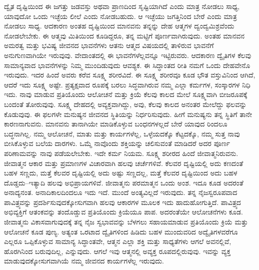 ದ್ವೈತ ದೃಷ್ಟಿಯಿಂದ ಈ ಜಗತ್ತು ಜಡವಸ್ತು ಅಥವಾ ಪ್ರಾಣದಿಂದ ಸೃಷ್ಟಿಯಾಗಿದೆ ಎಂದು ಮಾತ್ರ ನೋಡಲು ಸಾಧ್ಯ, ಯಾವುದೋ ಒಂದು ಇಚ್ಛೆಯ ಲೀಲೆ ಎಂದು ನೋಡಬಹುದು. ಆ ಇಚ್ಛೆಯು ಜಗತ್ತಿನಿಂದ ಬೇರೆ ಎಂದು ಮಾತ್ರ ನೋಡಲು ಸಾಧ್ಯ. ಆದಕಾರಣ ಅಂತಹ ದೃಷ್ಟಿಯಿಂದ ಮಾನವನು ತನ್ನನ್ನು ದೇಹ ಆತ್ಮಗಳ ದ್ವಂದ್ವಮಿಶ್ರವೆಂದು ನೋಡಲೇಬೇಕು. ಈ ಆತ್ಮವು ಮಿತಿಯಿಂದ ಕೂಡಿದ್ದರೂ, ತನ್ನ ಮಟ್ಟಿಗೆ ಪೂರ್ಣವಾಗಿರುವುದು. ಅಂತಹ ಮಾನವನ ಅಮರತ್ವ ಮತ್ತು ಭವಿಷ್ಯ ಜೀವನದ ಭಾವನೆಗಳು ಆತನು ಆತ್ಮದ ವಿಷಯದಲ್ಲಿ ತಾಳಿರುವ ಭಾವನೆಗೆ ಅನುಗುಣವಾಗಿಯೇ ಇರುವುವು. ವೇದಾಂತದಲ್ಲಿ ಈ ಭಾವನೆಗಳೆಲ್ಲವನ್ನೂ ಇಟ್ಟಿರುವರು. ಆದಕಾರಣ ದ್ವೈತಿಗಳ ಕೆಲವು ಸಾಮಾನ್ಯವಾದ ಭಾವನೆಗಳನ್ನು ನಿಮ್ಮ ಮುಂದಿಡುವುದು ಆವಶ್ಯಕ. ಈ ಸಿದ್ಧಾಂತದ ರೀತಿ ನಮಗೆ ಒಂದು ದೇಹವೇನೊ ಇರುವುದು. ಇದರ ಹಿಂದೆ ಅವರು ಕರೆವ ಸೂಕ್ಷ್ಮ ಶರೀರವಿದೆ. ಈ ಸೂಕ್ಷ್ಮ ಶರೀರವೂ ಕೂಡ ಭೌತ ವಸ್ತುವಿನಿಂದ ಆಗಿದೆ, ಆದರೆ ಇದು ಸೂಕ್ಷ್ಮ ಅಷ್ಟೇ. ಪ್ರತ್ಯಕ್ಷವಾದ ರೂಪಕ್ಕೆ ಬರಲು ಸಿದ್ಧವಾಗಿರುವ ನಮ್ಮ ಎಲ್ಲಾ ಕರ್ಮಗಳ, ಸಂಸ್ಕಾರಗಳ ನಿಧಿ ಇದು. ನಾವು ಮಾಡುವ ಪ್ರತಿಯೊಂದು ಆಲೋಚನೆ ಮತ್ತು ಕ್ರಿಯೆ ಕೆಲವು ಕಾಲದ ಮೇಲೆ ಸೂಕ್ಷ್ಮವಾಗಿ ಬೀಜರೂಪಕ್ಕೆ ಬಂದಂತೆ ತೋರುವುವು. ಸೂಕ್ಷ್ಮ ದೇಹದಲ್ಲಿ ಅವ್ಯಕ್ತವಾಗಿದ್ದು, ಅವು, ಕೆಲವು ಕಾಲದ ಅನಂತರ ಮೇಲೆದ್ದು ಫಲವನ್ನು ಕೊಡುವುವು. ಈ ಫಲಗಳೇ ಮನುಷ್ಯನ ಜೀವನದ ಸ್ಥಿತಿಯನ್ನು ನಿರ್ಧರಿಸುವುದು. ಹೀಗೆ ಮನುಷ್ಯನು ತನ್ನ ಸ್ಥಿತಿಗೆ ತಾನೇ ಕಾರಣನಾಗುವನು. ಮಾನವನು ತಾನಾಗಿಯೇ ಮಾಡಿಕೊಳ್ಳುವ ಬಂಧನಗಳಲ್ಲದೆ ಬೇರೆ ಯಾವುದ ರಿಂದಲೂ ಬದ್ಧನಾಗಿಲ್ಲ. ನಮ್ಮ ಆಲೋಚನೆ, ಮಾತು ಮತ್ತು ಕಾರ್ಯಗಳೆಲ್ಲ, ಒಳ್ಳೆಯದಕ್ಕೊ ಕೆಟ್ಟದಕ್ಕೊ, ನಮ್ಮ ಸುತ್ತ ನಾವು ಬೀಸಿಕೊಳ್ಳುವ ಬಲೆಯ ದಾರಗಳು. ಒಮ್ಮೆ ನಾವೊಂದು ಶಕ್ತಿಯನ್ನು ಚಲಿಸುವಂತೆ ಮಾಡಿದರೆ ಅದರ ಪೂರ್ಣ ಪರಿಣಾಮವನ್ನು ನಾವು ಪಡೆಯಲೇಬೇಕು. ಇದೇ ಕರ್ಮ ನಿಯಮ. ಸೂಕ್ಷ್ಮ ಶರೀರದ ಹಿಂದೆ ಜೀವಾತ್ಮನಿರುವನು. ಜೀವಾತ್ಮನ ಆಕಾರ ಮತ್ತು ಪ್ರಮಾಣಗಳ ವಿಚಾರವಾಗಿ ಹಲವು ಚರ್ಚೆಗಳಿವೆ. ಕೆಲವರ ದೃಷ್ಟಿಯಲ್ಲಿ ಅದು ಕಣದಂತೆ ಬಹಳ ಸಣ್ಣದು, ಮತ್ತೆ ಕೆಲವರ ದೃಷ್ಟಿಯಲ್ಲಿ ಅದು ಅಷ್ಟು ಸಣ್ಣದಲ್ಲ, ಮತ್ತೆ ಕೆಲವರ ದೃಷ್ಟಿಯಿಂದ ಅದು ಬಹಳ ದೊಡ್ಡದು–ಇತ್ಯಾದಿ ಹಲವು ಅಭಿಪ್ರಾಯಗಳಿವೆ. ಜೀವಾತ್ಮನು ಪರಮಾತ್ಮನ ಒಂದು ಅಂಶ. ಇದೂ ಕೂಡ ಅದರಂತೆ ಅನಾದ್ಯನಂತ. ಅನಾದಿಕಾಲದಿಂದಲೂ ಇದು ಇದೆ. ಮುಂದೆ ಅಂತ್ಯವಿಲ್ಲದೆ ಇರುವುದು. ತನ್ನ ನೈಜಸ್ವರೂಪವಾದ ಪಾವಿತ್ರ್ಯವನ್ನು ಪ್ರದರ್ಶಿಸುವುದಕ್ಕೋಸುಗವಾಗಿ ಹಲವು ಆಕಾರಗಳ ಮೂಲಕ ಇದು ಹಾದುಹೋಗುತ್ತಿದೆ. ಪಾವಿತ್ರ್ಯದ ಅಭಿವ್ಯಕ್ತಿಗೆ ಆತಂಕವನ್ನು ತಂದೊಡ್ಡುವ ಪ್ರತಿಯೊಂದು ಕ್ರಿಯೆಯೂ ಪಾಪ. ಅದರಂತೆಯೇ ಆಲೋಚನೆಗಳು ಕೂಡ. ಜೀವಾತ್ಮನು ವಿಕಾಸವಾಗುವುದಕ್ಕೆ ತನ್ನ ನೈಜ ಸ್ವಭಾವವನ್ನು ಬೆಳಗಲು ಸಹಾಯಮಾಡುವ ಪ್ರತಿಯೊಂದು ಕ್ರಿಯೆ ಮತ್ತು ಆಲೋಚನೆ ಕೂಡ ಪುಣ್ಯ. ಅತ್ಯಂತ ಒರಟಾದ ದ್ವೈತಿಗಳಿಂದ ಹಿಡಿದು ಬಹಳ ಮುಂದುವರಿದ ಅದ್ವೈತಿಗಳವರೆಗೂ ಎಲ್ಲರೂ ಒಪ್ಪಿಕೊಳ್ಳುವ ಸಾಮಾನ್ಯ ಸಿದ್ಧಾಂತವೇ, ಆತ್ಮನ ಎಲ್ಲಾ ಶಕ್ತಿ ಮತ್ತು ಸಾಧ್ಯತೆಗಳು ಆಗಲೆ ಅವನಲ್ಲಿವೆ, ಹೊರಗಿನಿಂದ ಬರುವುದಿಲ್ಲ, ಎನ್ನುವುದು. ಆಗಲೆ ಇವು ಆತ್ಮನಲ್ಲಿ ಅವ್ಯಕ್ತ ರೂಪದಲ್ಲಿರುವುವು. ಇವನ್ನು ವ್ಯಕ್ತ ಮಾಡುವುದಕ್ಕೋಸುಗವಾಗಿಯೆ ನಮ್ಮ ಜೀವನದ ಕಾರ್ಯಗಳೆಲ್ಲ ಇರುವುದು. 

